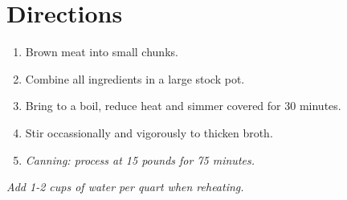 \documentclass[11pt,letterpaper]{article}
\begin{document}
\section*{Directions}
\begin{enumerate}
	\item Brown meat into small chunks.
	\item Combine all ingredients in a large stock pot.
	\item Bring to a boil, reduce heat and simmer covered for 30 minutes.
	\item Stir occassionally and vigorously to thicken broth.
	\item \textit{Canning: process at 15 pounds for 75 minutes.}
\end{enumerate}

\textit{Add 1-2 cups of water per quart when reheating.}
\end{document}
